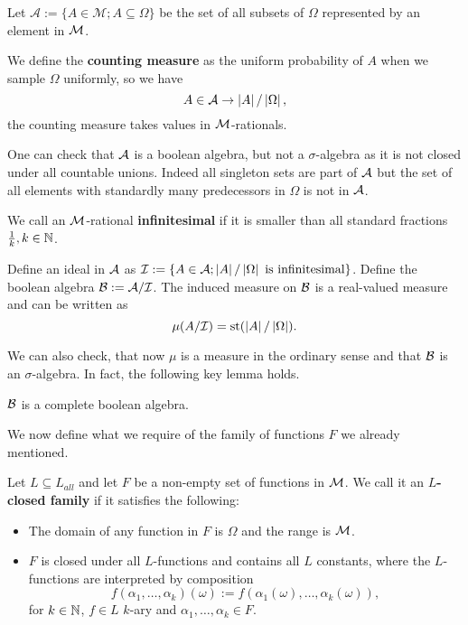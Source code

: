 \begin{defi}
Let $\mathcal{A}:=\{A\in\mathcal{M};A\subseteq \Omega\}$ be the set of all subsets of $\Omega$ represented by an element in $\mathcal{M}$.

We define the \textbf{counting measure} as the uniform probability of $A$ when we sample $\Omega$ uniformly, so we have
\[A\in\mathcal{A} \to \left|{A}\right|/\left|{\Omega}\right|,\]
the counting measure takes values in $\mathcal{M}$-rationals.
\end{defi}

One can check that $\mathcal{A}$ is a boolean algebra, but not a $\sigma$-algebra as it is not closed under all countable unions. Indeed all singleton sets are part of $\mathcal{A}$ but the set of all elements with standardly many predecessors in $\Omega$ is not in $\mathcal{A}$.

\begin{defi}
We call an $\mathcal{M}$-rational \textbf{infinitesimal} if it is smaller than all standard fractions $\frac{1}{k},k\in\mathbb{N}$.

Define an ideal in $\mathcal{A}$ as $\mathcal{I}:=\{A\in\mathcal{A};\left|{A}\right|/\left|{\Omega}\right|\text{ is infinitesimal}\}$. Define the boolean algebra $\mathcal{B}:=\mathcal{A}/\mathcal{I}$. The induced measure on $\mathcal{B}$ is a real-valued measure and can be written as \[\mu(A/\mathcal{I})=\text{st}(\left|{A}\right|/\left|{\Omega}\right|).\]
\end{defi}

We can also check, that now $\mu$ is a measure in the ordinary sense and that $\mathcal{B}$ is an $\sigma$-algebra. In fact, the following key lemma holds.

\begin{lemm}
$\mathcal{B}$ is a complete boolean algebra.
\end{lemm}

We now define what we require of the family of functions $F$ we already mentioned.

\begin{defi}
Let $L\subseteq L_{all}$ and let $F$ be a non-empty set of functions in $\mathcal{M}$. We call it an \textbf{$L$-closed family} if it satisfies the following:
\begin{itemize}
\item The domain of any function in $F$ is $\Omega$ and the range is $\mathcal{M}$.
\item $F$ is closed under all $L$-functions and contains all $L$ constants, where the $L$-functions are interpreted by composition
\[f(\alpha_1,\dots,\alpha_k)(\omega):=f(\alpha_1(\omega),\dots,\alpha_k(\omega)),\]
for $k\in\mathbb{N}$, $f\in L$ $k$-ary and $\alpha_1,\dots,\alpha_k\in F$.
\end{itemize}
\end{defi}

